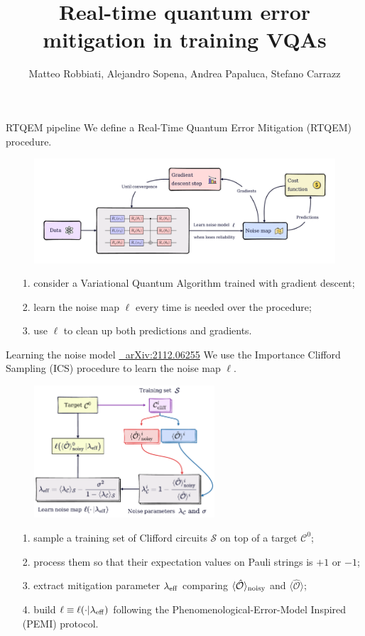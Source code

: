 \documentclass[8pt, xcolor={svgnames}, hyperref={linkcolor=black}]{beamer}
\title{Real-time quantum error mitigation in training VQAs}
\date{}
\author[Matteo Robbiati, Alejandro Sopena, Andrea Papaluca, Stefano Carrazza]{Matteo Robbiati, Alejandro Sopena, Andrea Papaluca, Stefano Carrazz}
\begin{document}
\begin{frame}{RTQEM pipeline}
We define a Real-Time Quantum Error Mitigation (RTQEM) procedure.
\begin{figure}
    \includegraphics[width=1\textwidth]{figures/rtqem.pdf}
\end{figure}
\begin{itemize}[noitemsep]
\item[1.] consider a Variational Quantum Algorithm trained with gradient descent;
\item[2.] learn the noise map $\ell$ every time is needed over the procedure;
\item[3.] use $\ell$ to clean up both predictions and gradients.
\end{itemize}
\end{frame}

\begin{frame}{Learning the noise model \hfill \href{https://arxiv.org/abs/2112.06255}{\faBook\,\, arXiv:2112.06255}}
We use the Importance Clifford Sampling (ICS) procedure to learn the noise map $\ell$.
\begin{figure}
    \includegraphics[width=0.6\textwidth]{figures/ics.pdf}
\end{figure}
\begin{itemize}[noitemsep]
\item[1.] sample a training set of Clifford circuits $\mathcal{S}$ on top of a target $\mathcal{C}^0$;
\item[2.] process them so that their expectation values on Pauli strings is  $+1$ or $-1$;
\item[3.] extract mitigation parameter $\lambda_{\rm eff}$ comparing $\langle \hat{\mathcal{O}}\rangle_{\rm noisy}$ and $\langle \hat{\mathcal{O}}\rangle$;
\item[4.] build $\ell \equiv \ell(\cdot | \lambda_{\rm eff})$ following the Phenomenological-Error-Model Inspired (PEMI) protocol.
\end{itemize}
\end{frame}
\end{document}
